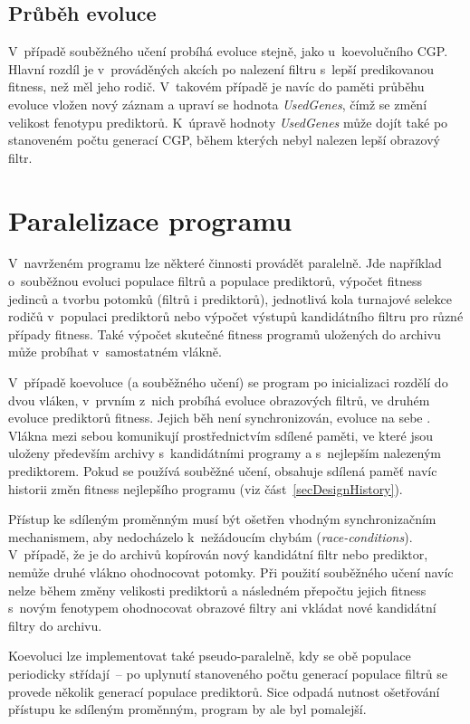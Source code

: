 \subsection{Průběh evoluce}

V~případě souběžného učení probíhá evoluce stejně, jako u~koevolučního CGP. Hlavní rozdíl je v~prováděných akcích po nalezení filtru s~lepší predikovanou fitness, než měl jeho rodič. V~takovém případě je navíc do paměti průběhu evoluce vložen nový záznam a upraví se hodnota \emph{UsedGenes}, čímž se změní velikost fenotypu prediktorů. K~úpravě hodnoty \emph{UsedGenes} může dojít také po stanoveném počtu generací CGP, během kterých nebyl nalezen lepší obrazový filtr.

\section{Paralelizace programu}
\label{secDesignParallel}

V~navrženém programu lze některé činnosti provádět paralelně. Jde například o~souběžnou evoluci populace filtrů a populace prediktorů, výpočet fitness jedinců a tvorbu potomků (filtrů i prediktorů), jednotlivá kola turnajové selekce rodičů v~populaci prediktorů nebo výpočet výstupů kandidátního filtru pro různé případy fitness. Také výpočet skutečné fitness programů uložených do archivu může probíhat v~samostatném vlákně.

V~případě koevoluce (a souběžného učení) se program po inicializaci rozdělí do dvou vláken, v~prvním z~nich probíhá evoluce obrazových filtrů, ve druhém evoluce prediktorů fitness. Jejich běh není synchronizován, evoluce na sebe . Vlákna mezi sebou komunikují prostřednictvím sdílené paměti, ve které jsou uloženy především archivy s~kandidátními programy a s~nejlepším nalezeným prediktorem. Pokud se používá souběžné učení, obsahuje sdílená paměť navíc historii změn fitness nejlepšího programu (viz část~\ref{secDesignHistory}).

Přístup ke sdíleným proměnným musí být ošetřen vhodným synchronizačním mechanismem, aby nedocházelo k~nežádoucím chybám (\emph{race-conditions}). V~případě, že je do archivů kopírován nový kandidátní filtr nebo prediktor, nemůže druhé vlákno ohodnocovat potomky. Při použití souběžného učení navíc nelze během změny velikosti prediktorů a následném přepočtu jejich fitness s~novým fenotypem ohodnocovat obrazové filtry ani vkládat nové kandidátní filtry do archivu.

Koevoluci lze implementovat také pseudo-paralelně, kdy se obě populace periodicky střídají~-- po uplynutí stanoveného počtu generací populace filtrů se provede několik generací populace prediktorů. Sice odpadá nutnost ošetřování přístupu ke sdíleným proměnným, program by ale byl pomalejší.

